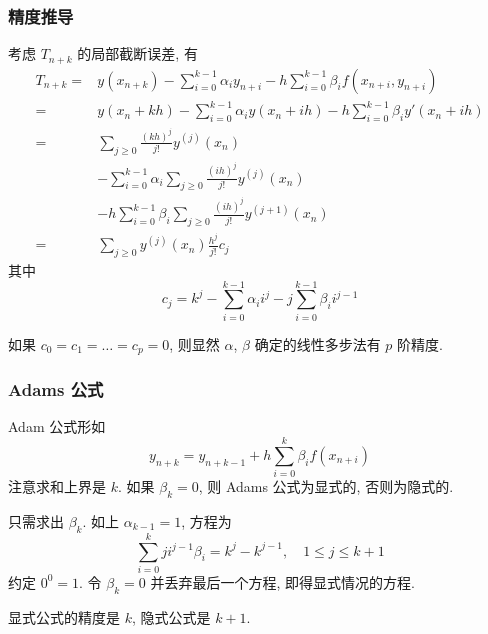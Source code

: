 \documentclass{ctexart}
\begin{document}
\subsubsection{精度推导}
    考虑 $T_{n+k}$ 的局部截断误差, 有 \begin{align*}
        T_{n+k} =& y(x_{n+k}) - \sum_{i=0}^{k-1} \alpha_i y_{n+i} - h \sum_{i=0}^{k-1} \beta_i f(x_{n+i}, y_{n+i})\\
                =& y(x_n + kh) - \sum_{i=0}^{k-1} \alpha_i y(x_n + ih) - h \sum_{i=0}^{k-1} \beta_i y'(x_n + ih)\\
                =& \sum_{j\ge 0} \frac{(kh)^j}{j!} y^{(j)}(x_n) \\
                &- \sum_{i=0}^{k-1} \alpha_i \sum_{j\ge 0} \frac{(ih)^j}{j!} y^{(j)}(x_n) \\
                &- h \sum_{i=0}^{k-1} \beta_i \sum_{j\ge 0} \frac{(ih)^j}{j!} y^{(j+1)}(x_n)\\
                =& \sum_{j\ge 0} y^{(j)}(x_n) \frac{h^j}{j!} c_j
    \end{align*}
    其中 \[
        c_j =  k^j - \sum_{i=0}^{k-1} \alpha_i i^j - j\sum_{i=0}^{k-1} \beta_i i^{j-1}\]
    \par
    如果 $c_0 = c_1 = \ldots = c_p = 0$, 则显然 $\alpha$, $\beta$ 确定的线性多步法有 $p$ 阶精度.
\subsubsection{Adams 公式}
    Adam 公式形如 \[
        y_{n+k} = y_{n+k-1} + h\sum_{i=0}^{k} \beta_i f(x_{n+i})\]
    注意求和上界是 $k$. 如果 $\beta_k =0$, 则 Adams 公式为显式的,
    否则为隐式的.\par
    只需求出 $\beta_k$. 如上 $\alpha_{k-1} = 1$, 方程为 \[
        \sum_{i=0}^{k} j i^{j-1} \beta_i = k^j - k^{j-1},\quad 1 \le j \le k+1\]
    约定 $0^0 = 1$. 令 $\beta_{k} =0$ 并丢弃最后一个方程, 即得显式情况的方程.\par
    显式公式的精度是 $k$, 隐式公式是 $k+1$.
\end{document}
